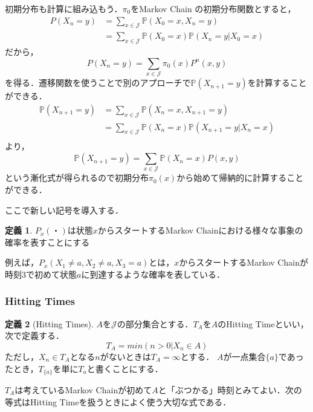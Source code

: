 \documentclass[12pt, a4paper]{jsarticle}
\theoremstyle{definition}
\newtheorem{defn}{定義}[section]
\begin{document}
初期分布も計算に組み込もう．$\pi_0$をMarkov Chain の初期分布関数とすると，
\begin{align*}
	P(X_n = y) &= \sum_{x \in \mathcal{J}}\mathbb{P} (X_0 = x, X_n = y) \\
	&= \sum_{x \in \mathcal{J}} \mathbb{P}(X_0 = x) \mathbb{P}(X_n = y | X_0 = x)
\end{align*}
だから，
\begin{equation}
	P(X_n = y) = \sum_{x \in \mathcal{J}} \pi_0(x) P^n(x,y) \label{24}
\end{equation}
を得る．遷移関数を使うことで別のアプローチで$\mathbb{P}(X_{n+1} = y)$を計算することができる．
\begin{align*}
\mathbb{P}(X_{n+1} = y) &= \sum_{x \in \mathcal{J}} \mathbb{P}(X_n = x, X_{n+1} = y) \\
&= \sum_{x \in \mathcal{J}} \mathbb{P}(X_n = x)\mathbb{P}(X_{n+1} = y | X_n = x) \\
\end{align*}
より，
\begin{equation}
\mathbb{P}(X_{n+1} = y) = \sum_{x \in \mathcal{J}} \mathbb{P}(X_n = x) P(x,y) \label{25}
\end{equation}
という漸化式が得られるので初期分布$\pi_0(x)$から始めて帰納的に計算することができる．

ここで新しい記号を導入する．
\begin{screen}
	\begin{defn}
	$P_x (・)$は状態$x$からスタートするMarkov Chainにおける様々な事象の確率を表すことにする
	\end{defn}
\end{screen}
例えば，$P_x(X_1 \neq a,X_2 \neq a,X_3 = a)$とは，$x$からスタートするMarkov Chainが時刻3で初めて状態$a$に到達するような確率を表している．

\subsubsection{Hitting Times}
\begin{screen}
\begin{defn}[Hitting Times]
$A$を$\mathcal{J}$の部分集合とする．$T_A$を$A$のHitting Timeといい，次で定義する．
\[T_A = min(n > 0 | X_n \in A)\]
ただし，$X_n \in T_A$となる$n$がないときは$T_A = \infty$とする．
$A$が一点集合$\{a\}$であったとき，$T_{\{a\}}$を単に$T_a$と書くことにする．
\end{defn}
\end{screen}
$T_A$は考えているMarkov Chainが初めて$A$と「ぶつかる」時刻とみてよい．次の等式はHitting Timeを扱うときによく使う大切な式である．
\end{document}
